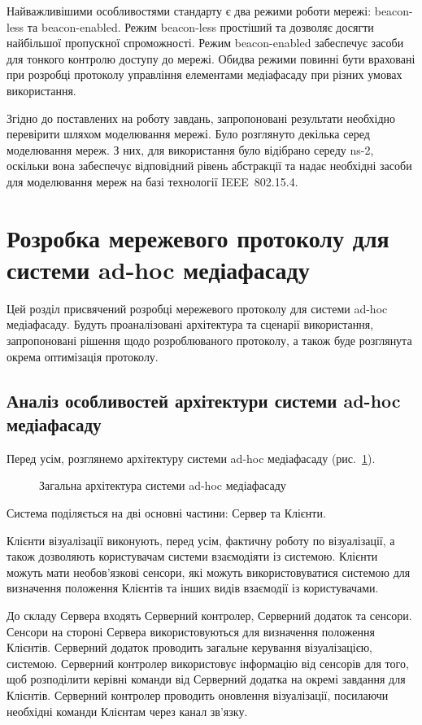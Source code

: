 \documentclass[a4paper,ukrainian,utf8,nocolumnsxix,floatsection,equationsection]{eskdtext}
\newcommand{\figref}[1]{рис.~\ref{#1}}
\newcommand{\iee}[0]{IEEE~802.15.4\xspace}
\newcommand{\blm}[0]{beacon-less\xspace}
\newcommand{\bem}[0]{beacon-enabled\xspace}
\begin{document}
Найважливішими особливостями стандарту є два режими роботи мережі: \blm та \bem. Режим \blm простіший та дозволяє досягти найбільшої пропускної спроможності. Режим \bem забеспечує засоби для тонкого контролю доступу до мережі. Обидва режими повинні бути враховані при розробці протоколу управління елементами медіафасаду при різних умовах використання.

Згідно до поставлених на роботу завдань, запропоновані результати необхідно перевірити шляхом моделювання мережі. Було розглянуто декілька серед моделювання мереж. З них, для використання було відібрано середу ns-2, оскільки вона забеспечує відповідний рівень абстракції та надає необхідні засоби для моделювання мереж на базі технології \iee.


\section{Розробка мережевого протоколу для системи ad-hoc медіафасаду}
\label{sec:2:network:protocol:amf}


Цей розділ присвячений розробці мережевого протоколу для системи ad-hoc медіафасаду. Будуть проаналізовані архітектура та сценарії використання, запропоновані рішення щодо розроблюваного протоколу, а також буде розглянута окрема оптимізація протоколу.

\subsection{Аналіз особливостей архітектури системи ad-hoc медіафасаду}
\label{sub:system:arch}

Перед усім, розглянемо архітектуру системи ad-hoc медіафасаду (\figref{fig:sys_arch}). 

\begin{figure}[bth]
\centering
{}
\caption{\label{fig:sys_arch}Загальна архітектура системи ad-hoc медіафасаду}
\end{figure}

Система поділяється на дві основні частини: Сервер та Клієнти.

Клієнти візуалізації виконують, перед усім, фактичну роботу по візуалізації, а також дозволяють користувачам системи взаємодіяти із системою. Клієнти можуть мати необов’язкові сенсори, які можуть використовуватися системою для визначення положення Клієнтів та інших видів взаємодії із користувачами.

До складу Сервера входять Серверний контролер, Серверний додаток та сенсори. Сенсори на стороні Сервера використовуються для визначення положення Клієнтів. Серверний додаток проводить загальне керування візуалізацією, системою. Серверний контролер використовує інформацію від сенсорів для того, щоб розподілити керівні команди від Серверний додатка на окремі завдання для Клієнтів. Серверний контролер проводить оновлення візуалізації, посилаючи необхідні команди Клієнтам через канал зв’язку.
\end{document}
